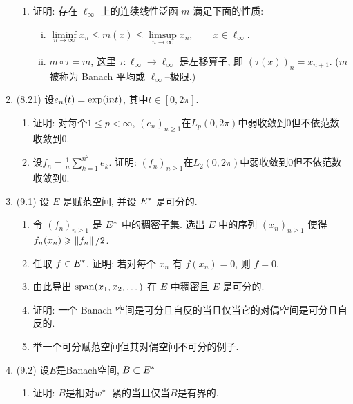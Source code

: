 \begin{enumerate}[label=\textbf{\arabic*.}, ref=\arabic*]
\begin{enumerate}[(1)]
                \item 证明: 存在 $ \ell_{\infty} $ 上的连续线性泛函 $ m $ 满足下面的性质:
                \begin{enumerate}[(i)]
                    \item $ \liminf\limits_{n\to\infty}x_{n}\leqslant m(x)\leqslant\limsup\limits_{n\to\infty}x_{n}, \qquad x\in\ell_{\infty} $.
                    \item $ m\circ \tau=m $, 这里 $ \tau: \ell_{\infty}\to\ell_{\infty} $ 是左移算子, 即 $ (\tau(x))_{n}=x_{n+1} $. ($ m $ 被称为 Banach 平均或 $ \ell_{\infty} $--极限.)
                \end{enumerate}
            \end{enumerate}
        \item (8.21) 设$ e_n(t)=\exp(\mathrm{i} nt) $, 其中$ t\in[0,2\pi] $.
        \begin{enumerate}[(1)]
            \item 证明: 对每个$ 1\leqslant p<\infty $, $ (e_n)_{n\geqslant 1} $在$ L_p(0,2\pi) $中弱收敛到0但不依范数收敛到0.
            \item 设$ f_n=\frac{1}{n}\sum\limits_{k=1}^{n^2}e_k $. 证明: $ (f_n)_{n\geqslant 1} $在$ L_2(0,2\pi) $中弱收敛到0但不依范数收敛到0.
        \end{enumerate}
        \item (9.1) 设 $ E $ 是赋范空间, 并设 $ E^{*} $ 是可分的.
        \begin{enumerate}[(1)]
            \item 令 $ (f_{n})_{n\geqslant1} $ 是 $ E^{*} $ 中的稠密子集. 选出 $ E $ 中的序列 $ (x_{n})_{n\geqslant1} $ 使得 $ f_{n}(x_{n})\geqslant \left\| f_{n} \right\|/2 $.
            \item 任取 $ f\in E^{*} $. 证明: 若对每个 $ x_{n} $ 有 $ f(x_{n})=0 $, 则 $ f=0 $.
            \item 由此导出 $ \operatorname{span}(x_{1}, x_{2}, \dots) $ 在 $ E $ 中稠密且 $ E $ 是可分的.
            \item 证明: 一个 Banach 空间是可分且自反的当且仅当它的对偶空间是可分且自反的.
            \item 举一个可分赋范空间但其对偶空间不可分的例子.
        \end{enumerate}
        \item (9.2) 设$ E $是Banach空间, $ B\subset E^{*} $
        \begin{enumerate}[(1)]
            \item 证明: $ B $是相对$ w^{*} $--紧的当且仅当$ B $是有界的.

\end{enumerate}
\end{enumerate}
